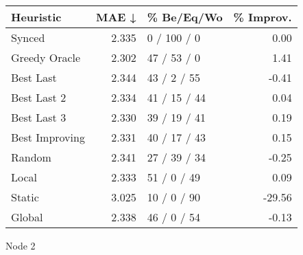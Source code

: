 \begin{tabular}{lrlr}
\toprule
\textbf{Heuristic} & \textbf{MAE ↓} & \textbf{\% Be/Eq/Wo} & \textbf{\% Improv.} \\
\midrule
            Synced &          2.335 &          0 / 100 / 0 &                0.00 \\
     Greedy Oracle &          2.302 &          47 / 53 / 0 &                1.41 \\
         Best Last &          2.344 &          43 / 2 / 55 &               -0.41 \\
       Best Last 2 &          2.334 &         41 / 15 / 44 &                0.04 \\
       Best Last 3 &          2.330 &         39 / 19 / 41 &                0.19 \\
    Best Improving &          2.331 &         40 / 17 / 43 &                0.15 \\
            Random &          2.341 &         27 / 39 / 34 &               -0.25 \\
             Local &          2.333 &          51 / 0 / 49 &                0.09 \\
            Static &          3.025 &          10 / 0 / 90 &              -29.56 \\
            Global &          2.338 &          46 / 0 / 54 &               -0.13 \\
\bottomrule
\end{tabular}
\caption{Node 2}
\label{tab:hr_iid_lr01_le2_bs4_2}
